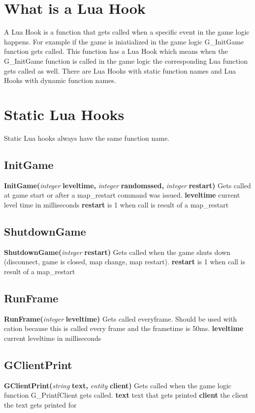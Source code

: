 \documentclass{scrreprt}
\begin{document}
\section{What is a Lua Hook}
\label{wia-lh}
A Lua Hook is a function that gets called when a specific event in the game logic happens. For example if the game is iniatialized in the game logic G\_InitGame function gets called. This function has a Lua Hook which means when the G\_InitGame function is called in the game logic the corresponding Lua function gets called as well. There are Lua Hooks with static function names and Lua Hooks with dynamic function names.
\section{Static Lua Hooks}
\label{s-lh}
Static Lua hooks always have the same function name.
\subsection{InitGame}
\label{init-game}
\textbf{InitGame(}\textit{integer} \textbf{leveltime,} \textit{integer} \textbf{randomssed, }\textit{integer} \textbf{restart)}
\newline
Gets called at game start or after a map\_restart command was issued.
\newline
\textbf{leveltime} current level time in milliseconds
\newline
\textbf{restart} is 1 when call is result of a map\_restart
\subsection{ShutdownGame}
\label{shutdown-game}
\textbf{ShutdownGame(}\textit{integer} \textbf{restart)}
\newline
Gets called when the game shuts down (disconnect, game is closed, map change, map restart).
\newline
\textbf{restart} is 1 when call is result of a map\_restart
\subsection{RunFrame}
\label{run-frame}
\textbf{RunFrame(}\textit{integer} \textbf{leveltime)}
\newline
Gets called everyframe. Should be used with cation because this is called every frame and the frametime is 50ms.
\newline
\textbf{leveltime} current leveltime in milliseconds
\subsection{GClientPrint}
\label{cli-print}
\textbf{GClientPrint(}\textit{string} \textbf{text, }\textit{entity }\textbf{client)}
\newline
Gets called when the game logic function G\_PrintfClient gets called.
\newline
\textbf{text} text that gets printed
\newline
\textbf{client} the client the text gets printed for
\end{document}

